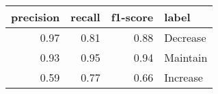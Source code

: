\begin{tabular}{rrrl}
\toprule
precision & recall & f1-score & label \\
\midrule
0.97 & 0.81 & 0.88 & Decrease \\
0.93 & 0.95 & 0.94 & Maintain \\
0.59 & 0.77 & 0.66 & Increase \\
\bottomrule
\end{tabular}
